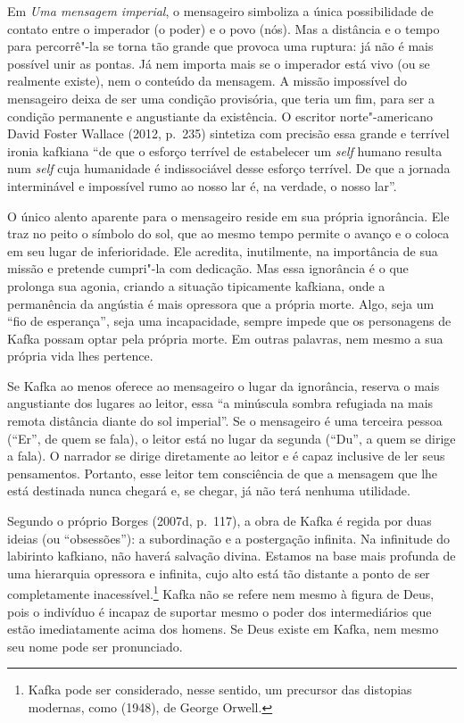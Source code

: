 Em \emph{Uma mensagem imperial}, o mensageiro simboliza a única
possibilidade de contato entre o imperador (o poder) e o povo (nós). Mas
a distância e o tempo para percorrê"-la se torna tão grande que provoca
uma ruptura: já não é mais possível unir as pontas. Já nem importa mais
se o imperador está vivo (ou se realmente existe), nem o conteúdo da
mensagem. A missão impossível do mensageiro deixa de ser uma condição
provisória, que teria um fim, para ser a condição permanente e
angustiante da existência. O escritor norte"-americano David Foster
Wallace (2012, p.~235) sintetiza com precisão essa grande e terrível
ironia kafkiana ``de que o esforço terrível de estabelecer um
\emph{self} humano resulta num \emph{self} cuja humanidade é
indissociável desse esforço terrível. De que a jornada interminável e
impossível rumo ao nosso lar é, na verdade, o nosso lar''.

O único alento aparente para o mensageiro reside em sua própria
ignorância. Ele traz no peito o símbolo do sol, que ao mesmo tempo
permite o avanço e o coloca em seu lugar de inferioridade. Ele acredita,
inutilmente, na importância de sua missão e pretende cumpri"-la com
dedicação. Mas essa ignorância é o que prolonga sua agonia, criando a
situação tipicamente kafkiana, onde a permanência da angústia é mais
opressora que a própria morte. Algo, seja um ``fio de esperança'', seja
uma incapacidade, sempre impede que os personagens de Kafka possam optar
pela própria morte. Em outras palavras, nem mesmo a sua própria vida
lhes pertence.

Se Kafka ao menos oferece ao mensageiro o lugar da ignorância, reserva o
mais angustiante dos lugares ao leitor, essa ``a minúscula sombra
refugiada na mais remota distância diante do sol imperial''. Se o
mensageiro é uma terceira pessoa (``Er'', de quem se fala), o leitor
está no lugar da segunda (``Du'', a quem se dirige a fala). O narrador
se dirige diretamente ao leitor e é capaz inclusive de ler seus
pensamentos. Portanto, esse leitor tem consciência de que a mensagem que
lhe está destinada nunca chegará e, se chegar, já não terá nenhuma
utilidade.

Segundo o próprio Borges (2007d, p.~117), a obra de Kafka é regida por
duas ideias (ou ``obsessões''): a subordinação e a postergação infinita.
Na infinitude do labirinto kafkiano, não haverá salvação divina. Estamos
na base mais profunda de uma hierarquia opressora e infinita, cujo alto
está tão distante a ponto de ser completamente inacessível.\footnote{Kafka pode ser considerado, nesse sentido, um precursor das distopias modernas, como {} (1948), de George Orwell.} Kafka não se
refere nem mesmo à figura de Deus, pois o indivíduo é incapaz de
suportar mesmo o poder dos intermediários que estão imediatamente acima
dos homens. Se Deus existe em Kafka, nem mesmo seu nome pode ser
pronunciado.

